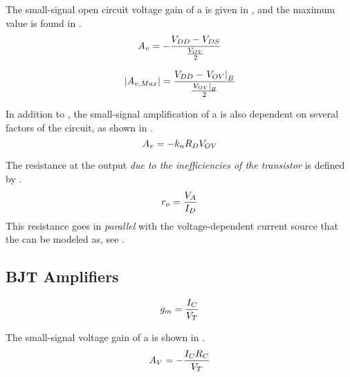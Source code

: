 The small-signal open circuit voltage gain of a  is given in , and the maximum value is found in .
\begin{equation}\label{eq:MOSFET-Small_Signal_Voltage_Gain}
  \Amp{\Voltage} = -\frac{\DCVoltage{DD} - \DCVoltage{DS}}{\frac{\OverdriveVoltage}{2}}
\end{equation}

\begin{equation}\label{eq:MOSFET-Small_Signal_Voltage_Gain-Max}
  \Abs{\Amp{\Voltage,Max}} = \frac{\DCVoltage{DD} - \left. \OverdriveVoltage \right\rvert_{\MaxBiasPoint}}{\frac{\left. \OverdriveVoltage \right\rvert_{\MaxBiasPoint}}{2}}
\end{equation}

In addition to , the small-signal amplification of a  is also dependent on several factors of the circuit, as shown in .
\begin{equation}\label{eq:MOSFET-Small_Signal_Voltage_Gain-Overdrive_Voltage}
  A_{v} = -k_{n} R_{D} V_{OV}
\end{equation}

The resistance at the output \emph{due to the inefficiencies of the transistor} is defined by .
\begin{equation}\label{eq:MOSFET-Transistor_Resistance}
  \ChannelModResist = \frac{\DCVoltage{A}}{\DCCurrent{\Drain}}
\end{equation}
This resistance goes in \emph{parallel} with the voltage-dependent current source that the  can be modeled as, see .


\subsection{BJT Amplifiers}\label{subsec:BJT_Amps}
\begin{equation}\label{eq:BJT-Transconductance_Gain}
  \TransconductanceGain = \frac{\DCCurrent{\Collector}}{\ThermalVoltage}
\end{equation}

The small-signal voltage gain of a  is shown in .
\begin{equation}\label{eq:BJT-Small_Signal_Voltage_Gain}
  \Amp{V} = - \frac{\DCCurrent{\Collector} R_{\Collector}}{\ThermalVoltage}
\end{equation}

